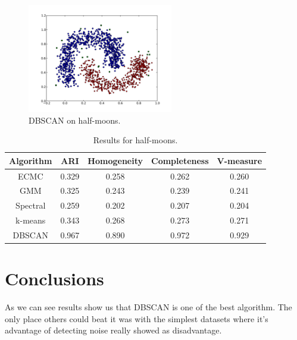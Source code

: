 \documentclass[conference]{IEEEtran}
\begin{document}
\begin{figure}[th]
\centering
\includegraphics[width=15pc]{dbscan_half-moons.pdf}
\caption{DBSCAN on half-moons.}
\label{DBSCAN_halfmoons}
\end{figure}

\begin{table}[htbp]
\caption{Results for half-moons.}
\label{halfmoonsresults}
\begin{center}
\setlength{\tabcolsep}{3pt}
\begin{tabular}{ |c|c|c|c|c| }
\hline
	Algorithm & ARI & Homogeneity & Completeness & V-measure\\ \hline
	
	ECMC & 0.329 & 0.258 & 0.262 & 0.260 \\ \hline
	GMM & 0.325 & 0.243 & 0.239 & 0.241 \\ \hline
	Spectral & 0.259 & 0.202 & 0.207 & 0.204 \\ \hline
	k-means & 0.343 & 0.268 & 0.273 & 0.271 \\ \hline
	DBSCAN & 0.967 & 0.890 & 0.972 & 0.929 \\ \hline
\end{tabular}
\end{center}
\end{table}


\section{Conclusions}

As we can see results show us that DBSCAN is one of the best algorithm. The only place others
could beat it was with the simplest datasets where it's advantage of detecting noise really showed
as disadvantage.
\end{document}
